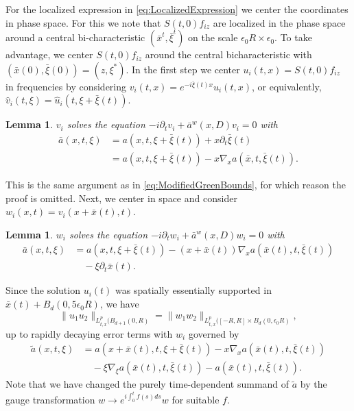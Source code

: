 \documentclass{amsart}
\newtheorem{lemma}[theorem]{Lemma}
\theoremstyle{definition}
\begin{document}
For the localized expression in \eqref{eq:LocalizedExpression} we center the coordinates in phase space. For this we note that $S(t,0) f_{iz}$ are localized in the phase space around a central bi-characteristic $(\bar{x}^t,\bar{\xi}^t)$ on the scale $\epsilon_0 R \times \epsilon_0$. To take advantage, we center $S(t,0) f_{iz}$ around the central bicharacteristic with $(\bar{x}(0),\bar{\xi}(0)) = (z,\xi^*)$. In the first step we center $u_i(t,x) = S(t,0) f_{i z}$ in frequencies by considering $v_i(t,x) = e^{-i \bar{\xi}(t) x} u_i(t,x)$, or equivalently, $\hat{v}_i(t,\xi) = \hat{u}_i(t,\xi + \bar{\xi}(t))$.
\begin{lemma}
$v_i$ solves the equation $-i \partial_t v_i + \bar{a}^w(x,D) v_i = 0$ with 
\begin{equation*}
\begin{split}
\bar{a}(x,t,\xi) &= a(x,t,\xi + \bar{\xi}(t)) + x \partial_t \bar{\xi}(t) \\
&= a(x,t,\xi + \bar{\xi}(t)) - x \nabla_x a(\bar{x},t,\bar{\xi}(t)).
\end{split}
\end{equation*}
\end{lemma}
This is the same argument as in \eqref{eq:ModifiedGreenBounds}, for which reason the proof is omitted.
Next, we center in space and consider $w_i(x,t) = v_i(x+\bar{x}(t),t)$.
\begin{lemma}
$w_i$ solves the equation $-i \partial_t w_i + \bar{a}^w(x,D) w_i = 0$ with
\begin{equation*}
\begin{split}
\bar{a}(x,t,\xi) &= a(x,t,\xi + \bar{\xi}(t)) - (x+\bar{x}(t)) \nabla_x a(\bar{x}(t),t,\bar{\xi}(t)) \\
&\quad - \xi \partial_t \bar{x}(t).
\end{split}
\end{equation*}
\end{lemma}
Since the solution $u_i(t)$ was spatially essentially supported in $\bar{x}(t) + B_d(0,5 \epsilon_0 R)$, we have
\begin{equation*}
\| u_1 u_2 \|_{L^p_{t,x}(B_{d+1}(0,R)} = \| w_1 w_2 \|_{L^p_{t,x}([-R,R] \times B_d(0, \epsilon_0 R)},
\end{equation*}
up to rapidly decaying error terms with $w_i$ governed by
\begin{equation*}
\begin{split}
\tilde{a}(x,t,\xi) &= a(x+\bar{x}(t),t,\xi + \bar{\xi}(t)) - x \nabla_x a(\bar{x}(t),t,\bar{\xi}(t)) \\
&\quad - \xi \nabla_{\xi} a(\bar{x}(t),t,\bar{\xi}(t)) - a(\bar{x}(t),t,\bar{\xi}(t)).
\end{split}
\end{equation*}
Note that we have changed the purely time-dependent summand of $\tilde{a}$ by the gauge transformation $w \to e^{i \int_0^t f(s) ds} w$ for suitable $f$.
\end{document}
